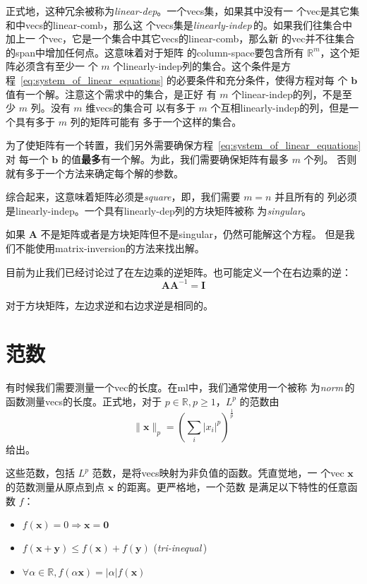 正式地，这种冗余被称为\emph{\gls{linear-dep}}。一个\gls*{vecs}集，如果其中没有一
个\gls*{vec}是其它集和中\gls*{vecs}的\gls*{linear-comb}，那么这
个\gls*{vecs}集是\emph{\gls{linearly-indep}}\,的。如果我们往集合中加上一
个\gls*{vec}，它是一个集合中其它\gls*{vecs}的\gls*{linear-comb}，那么新
的\gls*{vec}并不往集合的\gls*{span}中增加任何点。这意味着对于矩阵
的\gls*{column-space}要包含所有 $\mathbb{R}^m$，这个矩阵必须含有至少一
个 $m$ 个\gls*{linearly-indep}列的集合。这个条件是方
程~\ref{eq:system_of_linear_equations} 的必要条件和充分条件，使得方程对每
个 $\pmb{b}$ 值有一个解。注意这个需求中的集合，是正好
有 $m$ 个\gls*{linear-indep}的列，不是至少 $m$ 列。没有 $m$ 维\gls*{vecs}的集合可
以有多于 $m$ 个互相\gls*{linearly-indep}的列，但是一个具有多于 $m$ 列的矩阵可能有
多于一个这样的集合。

为了使矩阵有一个转置，我们另外需要确保方程~\ref{eq:system_of_linear_equations} 对
每一个 $\pmb{b}$ 的值\textbf{最多}有一个解。为此，我们需要确保矩阵有最多 $m$ 个列。
否则就有多于一个方法来确定每个解的参数。

综合起来，这意味着矩阵必须是\emph{\gls{square}}，即，我们需要 $m = n$ 并且所有的
列必须是\gls*{linearly-indep}。一个具有\gls*{linearly-dep}列的方块矩阵被称
为\emph{\gls{singular}}。

如果 $\pmb{A}$ 不是矩阵或者是方块矩阵但不是\gls*{singular}，仍然可能解这个方程。
但是我们不能使用\gls*{matrix-inversion}的方法来找出解。

目前为止我们已经讨论过了在左边乘的逆矩阵。也可能定义一个在右边乘的逆：
\begin{equation}
  \pmb{A}\pmb{A}^{-1} = \pmb{I}
\end{equation}

对于方块矩阵，左边求逆和右边求逆是相同的。

\section{范数}
\label{sec:norms}

有时候我们需要测量一个\gls*{vec}的长度。在\gls*{ml}中，我们通常使用一个被称
为\emph{\gls{norm}}\,的函数测量\gls*{vecs}的长度。正式地，对于
$p \in \mathbb{R}, p \geq 1$，$L^p$ 的范数由
\begin{equation}
  \|\pmb{x}\|_p = \left(\sum_i|x_i|^p\right)^{\frac{1}{p}}
  \label{eq:lp_norm}
\end{equation}
给出。

这些范数，包括 $L^p$ 范数，是将\gls*{vecs}映射为非负值的函数。凭直觉地，一
个\gls*{vec} $\pmb{x}$ 的范数测量从原点到点 $\pmb{x}$ 的距离。更严格地，一个范数
是满足以下特性的任意函数 $f$：
\begin{itemize}
\item $f(\pmb{x}) = 0 \Rightarrow \pmb{x} = \pmb{0}$
\item $f(\pmb{x} + \pmb{y}) \leq f(\pmb{x}) + f(\pmb{y})$
  (\emph{\gls{tri-inequal}}\,)
\item $\forall \alpha \in \mathbb{R}, f(\alpha \pmb{x}) = |\alpha|f(\pmb{x})$
\end{itemize}

